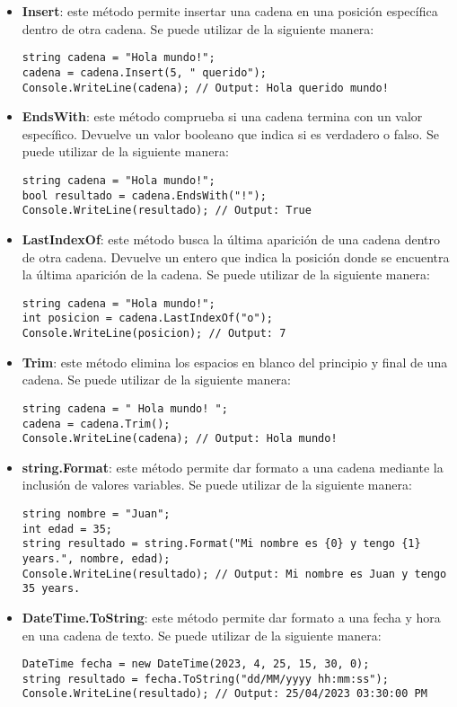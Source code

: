\documentclass[executivepaper]{article}
\begin{document}
\begin{itemize}
\item \textbf{Insert}: este método permite insertar una cadena en una posición específica dentro de otra cadena. Se puede utilizar de la siguiente manera:
\begin{lstlisting}
string cadena = "Hola mundo!";
cadena = cadena.Insert(5, " querido");
Console.WriteLine(cadena); // Output: Hola querido mundo!
\end{lstlisting}
\item \textbf{EndsWith}: este método comprueba si una cadena termina con un valor específico. Devuelve un valor booleano que indica si es verdadero o falso. Se puede utilizar de la siguiente manera:
\begin{lstlisting}
string cadena = "Hola mundo!";
bool resultado = cadena.EndsWith("!");
Console.WriteLine(resultado); // Output: True
\end{lstlisting}
\item \textbf{LastIndexOf}: este método busca la última aparición de una cadena dentro de otra cadena. Devuelve un entero que indica la posición donde se encuentra la última aparición de la cadena. Se puede utilizar de la siguiente manera:
\begin{lstlisting}
string cadena = "Hola mundo!";
int posicion = cadena.LastIndexOf("o");
Console.WriteLine(posicion); // Output: 7
\end{lstlisting}
\item \textbf{Trim}: este método elimina los espacios en blanco del principio y final de una cadena. Se puede utilizar de la siguiente manera:
\begin{lstlisting}
string cadena = " Hola mundo! ";
cadena = cadena.Trim();
Console.WriteLine(cadena); // Output: Hola mundo!
\end{lstlisting}
\item \textbf{string.Format}: este método permite dar formato a una cadena mediante la inclusión de valores variables. Se puede utilizar de la siguiente manera:
\begin{lstlisting}
string nombre = "Juan";
int edad = 35;
string resultado = string.Format("Mi nombre es {0} y tengo {1} years.", nombre, edad);
Console.WriteLine(resultado); // Output: Mi nombre es Juan y tengo 35 years.
\end{lstlisting}
\item \textbf{DateTime.ToString}: este método permite dar formato a una fecha y hora en una cadena de texto. Se puede utilizar de la siguiente manera:
\begin{lstlisting}
DateTime fecha = new DateTime(2023, 4, 25, 15, 30, 0);
string resultado = fecha.ToString("dd/MM/yyyy hh:mm:ss");
Console.WriteLine(resultado); // Output: 25/04/2023 03:30:00 PM
\end{lstlisting}
\end{itemize}
\end{document}
